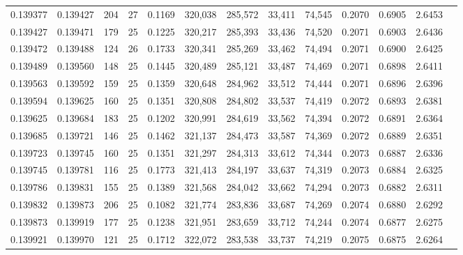 \begin{tabular}{rrrrrrrrrrrrr}
0.139377 & 0.139427 & 204 &  27 &                                     0.1169 & 320,038 & 285,572 &  33,411 &  74,545 & 0.2070 & 0.6905 & 2.6453 \\
0.139427 & 0.139471 & 179 &  25 &                                     0.1225 & 320,217 & 285,393 &  33,436 &  74,520 & 0.2071 & 0.6903 & 2.6436 \\
0.139472 & 0.139488 & 124 &  26 &                                     0.1733 & 320,341 & 285,269 &  33,462 &  74,494 & 0.2071 & 0.6900 & 2.6425 \\
0.139489 & 0.139560 & 148 &  25 &                                     0.1445 & 320,489 & 285,121 &  33,487 &  74,469 & 0.2071 & 0.6898 & 2.6411 \\
0.139563 & 0.139592 & 159 &  25 &                                     0.1359 & 320,648 & 284,962 &  33,512 &  74,444 & 0.2071 & 0.6896 & 2.6396 \\
0.139594 & 0.139625 & 160 &  25 &                                     0.1351 & 320,808 & 284,802 &  33,537 &  74,419 & 0.2072 & 0.6893 & 2.6381 \\
0.139625 & 0.139684 & 183 &  25 &                                     0.1202 & 320,991 & 284,619 &  33,562 &  74,394 & 0.2072 & 0.6891 & 2.6364 \\
0.139685 & 0.139721 & 146 &  25 &                                     0.1462 & 321,137 & 284,473 &  33,587 &  74,369 & 0.2072 & 0.6889 & 2.6351 \\
0.139723 & 0.139745 & 160 &  25 &                                     0.1351 & 321,297 & 284,313 &  33,612 &  74,344 & 0.2073 & 0.6887 & 2.6336 \\
0.139745 & 0.139781 & 116 &  25 &                                     0.1773 & 321,413 & 284,197 &  33,637 &  74,319 & 0.2073 & 0.6884 & 2.6325 \\
0.139786 & 0.139831 & 155 &  25 &                                     0.1389 & 321,568 & 284,042 &  33,662 &  74,294 & 0.2073 & 0.6882 & 2.6311 \\
0.139832 & 0.139873 & 206 &  25 &                                     0.1082 & 321,774 & 283,836 &  33,687 &  74,269 & 0.2074 & 0.6880 & 2.6292 \\
0.139873 & 0.139919 & 177 &  25 &                                     0.1238 & 321,951 & 283,659 &  33,712 &  74,244 & 0.2074 & 0.6877 & 2.6275 \\
0.139921 & 0.139970 & 121 &  25 &                                     0.1712 & 322,072 & 283,538 &  33,737 &  74,219 & 0.2075 & 0.6875 & 2.6264 \\

\end{tabular}
